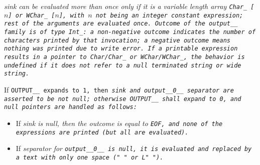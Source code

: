 \it{sink} can be evaluated more than once only if it is a variable length array
\tt{Char_ [}$n$\tt{]} or \tt{WChar_ [}$n$\tt{]}, with $n$ not being an
integer constant expression; rest of the arguments are evaluated once.
Outcome of the \tt{output__} family is of type \tt{Int_}:
a non-negative outcome indicates the number of characters printed by that
invocation; a negative outcome means nothing was printed due to write error.
If a printable expression results in a pointer to \tt{Char}/\tt{Char_}
or \tt{WChar}/\tt{WChar_}, the behavior is undefined if it
does not refer to a null terminated string or wide string.

If \tt{OUTPUT__} expands to \tt{1}, then \it{sink} and \tt{output__0__}
\it{separator} are asserted to be not null; otherwise \tt{OUTPUT__}
shall expand to \tt{0}, and null pointers are handled as follows:

\begin{itemize}[nosep]

\item If \it{sink} is null, then the outcome is equal to \tt{EOF},
and none of the expressions are printed (but all are evaluated).

\item If \it{separator} for \tt{output__0__} is null, it is evaluated
and replaced by a text with only one space (\tt{" "} or \tt{L" "}).

\end{itemize}
